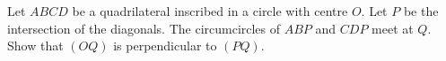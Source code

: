 Let $ABCD$ be a quadrilateral inscribed in a circle with centre $O$. Let $P$ be the intersection of the diagonals. The circumcircles of $ABP$ and $CDP$ meet at $Q$. Show that $(OQ)$ is perpendicular to $(PQ)$.
